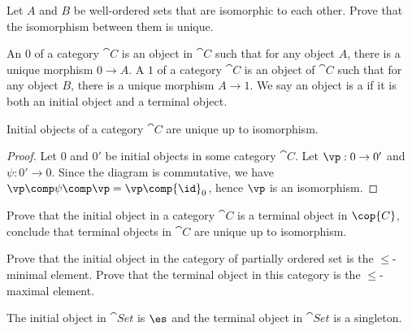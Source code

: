 \documentclass[10pt]{article}
\begin{document}
\begin{problem}
    Let $A$ and $B$ be well-ordered sets that are isomorphic to each other. Prove that the isomorphism between them is unique.
\end{problem}
\begin{definition}
    An  $0$ of a category $\cat{C}$ is an object in $\cat{C}$ such that for any object $A$, there is a unique morphism $0\to A$. A  $1$ of a category $\cat{C}$ is an object of $\cat{C}$ such that for any object $B$, there is a unique morphism $A\to 1$. We say an object is a  if it is both an initial object and a terminal object.
\end{definition}
\begin{proposition}
    Initial objects of a category $\cat{C}$ are unique up to isomorphism.
\end{proposition}
\begin{proof}
    Let $0$ and $0'$ be initial objects in some category $\cat{C}$. Let $\vp:0\to 0'$ and $\psi:0'\to 0$. Since the diagram is commutative, we have $\vp\comp\psi\comp\vp=\vp\comp{\id}_{0}$, hence $\vp$ is an isomorphism. 
\end{proof}
\begin{center}
\end{center}
\begin{problem}
    Prove that the initial object in a category $\cat{C}$ is a terminal object in $\cop{C}$, conclude that terminal objects in $\cat{C}$ are unique up to isomorphism.
\end{problem}
\begin{problem}
    Prove that the initial object in the category of partially ordered set is the $\le$-minimal element. Prove that the terminal object in this category is the $\le$-maximal element.
\end{problem}
\begin{proposition}
    The initial object in $\cat{Set}$ is $\es$ and the terminal object in $\cat{Set}$ is a singleton.
\end{proposition}
\end{document}
